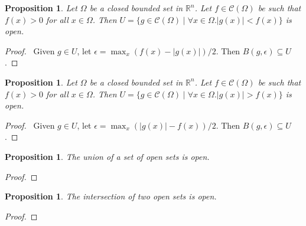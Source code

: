 \documentclass{book}
\let\qed\relax
\newtheorem{prop}[ax]{Proposition}
\theoremstyle{definition}
\begin{document}
\begin{prop}
Let $\Omega$ be a closed bounded set in $\mathbb{R}^n$. Let $f \in \mathcal{C}(\Omega)$ be such that $f(x) > 0$ for all $x \in \Omega$. Then $U = \{ g \in \mathcal{C}(\Omega) \mid \forall x \in \Omega. |g(x)| < f(x) \}$ is open.
\end{prop}

\begin{proof}
\pf\ Given $g \in U$, let $\epsilon = \max_x (f(x) - |g(x)|)/2$. Then $B(g,\epsilon) \subseteq U$. \qed
\end{proof}

\begin{prop}
Let $\Omega$ be a closed bounded set in $\mathbb{R}^n$. Let $f \in \mathcal{C}(\Omega)$ be such that $f(x) > 0$ for all $x \in \Omega$. Then $U = \{ g \in \mathcal{C}(\Omega) \mid \forall x \in \Omega. |g(x)| > f(x) \}$ is open.
\end{prop}

\begin{proof}
\pf\ Given $g \in U$, let $\epsilon = \max_x (|g(x)| - f(x))/2$. Then $B(g,\epsilon) \subseteq U$. \qed
\end{proof}

\begin{prop}
\label{prop:unionopen}
The union of a set of open sets is open.
\end{prop}

\begin{proof}
\pf
{}
\qed
\end{proof}

\begin{prop}
\label{prop:openint}
The intersection of two open sets is open.
\end{prop}

\begin{proof}
\pf
{}
\qed
\end{proof}
\end{document}
